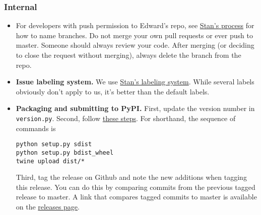 \subsubsection{Internal}

\begin{itemize}
\item
  For developers with push permission to Edward's repo, see
  \href{https://github.com/stan-dev/stan/wiki/Developer-Process#information-to-include-in-pull-request}{Stan's
  process} for how to name branches. Do not merge your own pull
  requests or ever push to master. Someone should always review your
  code. After merging (or deciding to close the request without
  merging), always delete the branch from the repo.
\item
  \textbf{Issue labeling system.} We use
  \href{https://github.com/stan-dev/stan/issues}{Stan's labeling system}.
  While several labels obviously don't apply to us, it's better than the
  default labels.
\item
  \textbf{Packaging and submitting to PyPI.} First, update the version
  number in \texttt{version.py}. Second, follow
  \href{https://packaging.python.org/en/latest/distributing/\#packaging-your-project}{these
  steps}. For shorthand, the sequence of commands is

\begin{lstlisting}[class=JSON]
python setup.py sdist
python setup.py bdist_wheel
twine upload dist/*
\end{lstlisting}

  Third, tag the release on Github and note the new additions when
  tagging this release. You can do this by comparing commits from the
  previous tagged release to master. A link that compares tagged commits
  to master is available on the
  \href{https://github.com/blei-lab/edward/releases}{releases page}.
\end{itemize}
